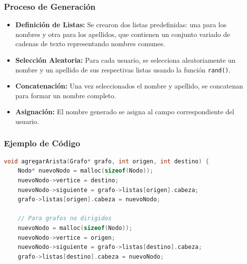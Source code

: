 \documentclass[9pt,letterpaper,onecolumn]{rho-class/rho}
\begin{document}
\subsubsection{Proceso de Generación}
\begin{itemize}
	\item \textbf{Definición de Listas:} Se crearon dos listas predefinidas: una para los nombres y otra para los apellidos, que contienen un conjunto variado de cadenas de texto representando nombres comunes.
	\item \textbf{Selección Aleatoria:} Para cada usuario, se selecciona aleatoriamente un nombre y un apellido de sus respectivas listas usando la función \texttt{rand()}.
	\item \textbf{Concatenación:} Una vez seleccionados el nombre y apellido, se concatenan para formar un nombre completo.
	\item \textbf{Asignación:} El nombre generado se asigna al campo correspondiente del usuario.
\end{itemize}
\newpage
\subsubsection{Ejemplo de Código}
\begin{lstlisting}[caption={Ejemplo de código, utilizando las normas de codificación}, label={lst:normas_codificacion}, language=C]
	void agregarArista(Grafo* grafo, int origen, int destino) {
	Nodo* nuevoNodo = malloc(sizeof(Nodo));
	nuevoNodo->vertice = destino;
	nuevoNodo->siguiente = grafo->listas[origen].cabeza;
	grafo->listas[origen].cabeza = nuevoNodo;
	
	// Para grafos no dirigidos
	nuevoNodo = malloc(sizeof(Nodo));
	nuevoNodo->vertice = origen;
	nuevoNodo->siguiente = grafo->listas[destino].cabeza;
	grafo->listas[destino].cabeza = nuevoNodo;
\end{lstlisting}
\end{document}
